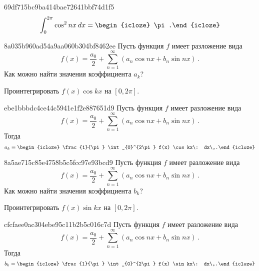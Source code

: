 \begin{note}{69df715bc9ba414bae72641bbf74d1f5}
    \[
        \int_{0}^{2\pi} \cos^2 nx \: dx = \begin{icloze}{1}\pi.\end{icloze}
    \]
\end{note}

\begin{note}{8a035b960ad54a9aa060b304bf8462ee}
    Пусть функция \({ f }\) имеет разложение вида
    \[
        f(x) = \frac{a_0}{2} + \sum_{n=1}^{\infty} (a_n \cos nx + b_n \sin nx)\,.
    \]
    Как можно найти значения коэффициента \({ a_k }\)?

    \begin{cloze}{1}
        Проинтегрировать \({ f(x) \cos kx }\) на \({ [0, 2\pi] }\).
    \end{cloze}
\end{note}

\begin{note}{ebe1bbbdc4ce44c5941e1f2e887651d9}
    Пусть функция \({ f }\) имеет разложение вида
    \[
        f(x) = \frac{a_0}{2} + \sum_{n=1}^{\infty} (a_n \cos nx + b_n \sin nx)\,.
    \]
    Тогда
    \[
        a_k = \begin{icloze}{1}\frac{1}{\pi} \int_{0}^{2\pi} f(x) \cos kx\: dx\,.\end{icloze}
    \]
\end{note}

\begin{note}{8a5ae715c85e4758b5c5fcc97e93bcd9}
    Пусть функция \({ f }\) имеет разложение вида
    \[
        f(x) = \frac{a_0}{2} + \sum_{n=1}^{\infty} (a_n \cos nx + b_n \sin nx)\,.
    \]
    Как можно найти значения коэффициента \({ b_k }\)?

    \begin{cloze}{1}
        Проинтегрировать \({ f(x) \sin kx }\) на \({ [0, 2\pi] }\).
    \end{cloze}
\end{note}

\begin{note}{cfcfaee0ac304ebe95c11b2b5c016c7d}
    Пусть функция \({ f }\) имеет разложение вида
    \[
        f(x) = \frac{a_0}{2} + \sum_{n=1}^{\infty} (a_n \cos nx + b_n \sin nx)\,.
    \]
    Тогда
    \[
        b_k = \begin{icloze}{1}\frac{1}{\pi} \int_{0}^{2\pi} f(x) \sin kx\: dx\,.\end{icloze}
    \]
\end{note}

